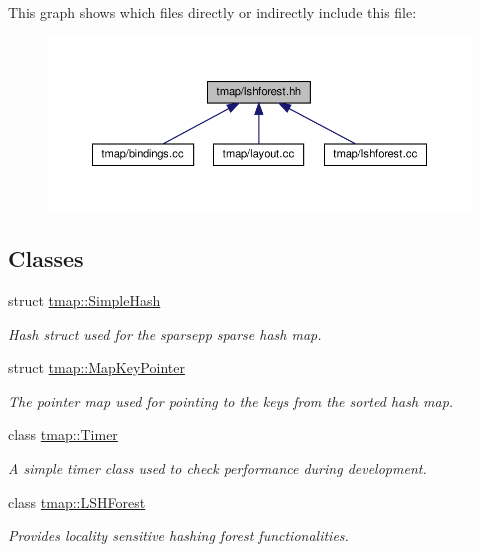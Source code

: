 This graph shows which files directly or indirectly include this file\+:\nopagebreak
\begin{figure}[H]
\begin{center}
\leavevmode
\includegraphics[width=350pt]{lshforest_8hh__dep__incl}
\end{center}
\end{figure}
\subsection*{Classes}
\begin{DoxyCompactItemize}
\item 
struct \hyperlink{structtmap_1_1SimpleHash}{tmap\+::\+Simple\+Hash}
\begin{DoxyCompactList}\small\item\em Hash struct used for the sparsepp sparse hash map. \end{DoxyCompactList}\item 
struct \hyperlink{structtmap_1_1MapKeyPointer}{tmap\+::\+Map\+Key\+Pointer}
\begin{DoxyCompactList}\small\item\em The pointer map used for pointing to the keys from the sorted hash map. \end{DoxyCompactList}\item 
class \hyperlink{classtmap_1_1Timer}{tmap\+::\+Timer}
\begin{DoxyCompactList}\small\item\em A simple timer class used to check performance during development. \end{DoxyCompactList}\item 
class \hyperlink{classtmap_1_1LSHForest}{tmap\+::\+L\+S\+H\+Forest}
\begin{DoxyCompactList}\small\item\em Provides locality sensitive hashing forest functionalities. \end{DoxyCompactList}\end{DoxyCompactItemize}


